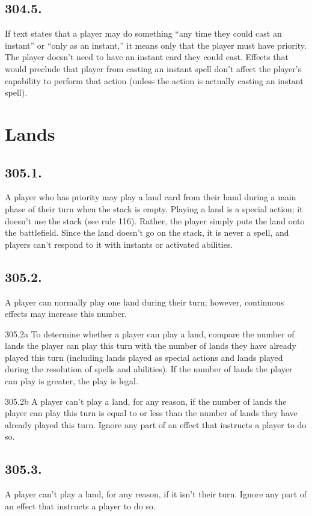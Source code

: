 \subsection*{304.5.}
If text states that a player may do something “any time they could cast an instant” or “only as an instant,” it means only that the player must have priority. The player doesn’t need to have an instant card they could cast. Effects that would preclude that player from casting an instant spell don’t affect the player’s capability to perform that action (unless the action is actually casting an instant spell).

\section{Lands}
\subsection*{305.1.}
A player who has priority may play a land card from their hand during a main phase of their turn when the stack is empty. Playing a land is a special action; it doesn’t use the stack (see rule 116). Rather, the player simply puts the land onto the battlefield. Since the land doesn’t go on the stack, it is never a spell, and players can’t respond to it with instants or activated abilities.

\subsection*{305.2.}
A player can normally play one land during their turn; however, continuous effects may increase this number.

305.2a To determine whether a player can play a land, compare the number of lands the player can play this turn with the number of lands they have already played this turn (including lands played as special actions and lands played during the resolution of spells and abilities). If the number of lands the player can play is greater, the play is legal.

305.2b A player can’t play a land, for any reason, if the number of lands the player can play this turn is equal to or less than the number of lands they have already played this turn. Ignore any part of an effect that instructs a player to do so.

\subsection*{305.3.}
A player can’t play a land, for any reason, if it isn’t their turn. Ignore any part of an effect that instructs a player to do so.


